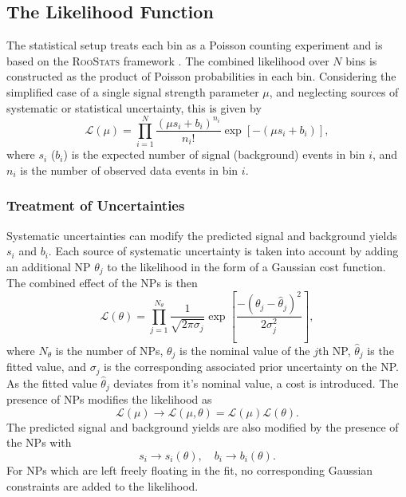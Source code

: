 \subsection{The Likelihood Function}

The statistical setup treats each bin as a Poisson counting experiment and is based on the \textsc{RooStats} framework \cite{moneta2010roostats,RooFit}.
The combined likelihood over $N$ bins is constructed as the product of Poisson probabilities in each bin.
Considering the simplified case of a single signal strength parameter $\mu$, and neglecting sources of systematic or statistical uncertainty, this is given by
%
\begin{equation}
    \mathcal{L}(\mu) = \prod_{i=1}^N \frac{(\mu s_i + b_i)^{n_i}}{n_i!} \exp \left[ - (\mu s_i + b_i) \right],
\end{equation}
%
where $s_i$ ($b_i$) is the expected number of signal (background) events in bin $i$, and $n_i$ is the number of observed data events in bin $i$.

\subsubsection{Treatment of Uncertainties}

Systematic uncertainties can modify the predicted signal and background yields $s_i$ and $b_i$. 
Each source of systematic uncertainty is taken into account by adding an additional NP $\theta_j$ to the likelihood in the form of a Gaussian cost function.
The combined effect of the NPs is then
%
\begin{equation}
  \mathcal{L}(\theta) = 
  \prod_{j = 1}^{N_\theta}
  \frac{1}{\sqrt{2 \pi \sigma_j}}
  \exp\left[ \frac{- (\theta_j - \hat{\theta}_j)^2}{2 \sigma_j^2} \right] ,
\end{equation}
%
where $N_\theta$ is the number of NPs, $\theta_j$ is the nominal value of the $j$th NP, $\hat{\theta}_j$ is the fitted value, and $\sigma_j$ is the corresponding associated prior uncertainty on the NP.
As the fitted value $\hat{\theta}_j$ deviates from it's nominal value, a cost is introduced.
The presence of NPs modifies the likelihood as 
%
\begin{equation}
    \mathcal{L}(\mu) \rightarrow \mathcal{L}(\mu, \theta) = \mathcal{L}(\mu) \mathcal{L}(\theta) .
\end{equation}
%
The predicted signal and background yields are also modified by the presence of the NPs with
%
\begin{equation}
  s_i \rightarrow s_i(\theta) , \quad b_i \rightarrow b_i(\theta) .
\end{equation}
%
For NPs which are left freely floating in the fit, no corresponding Gaussian constraints are added to the likelihood.

